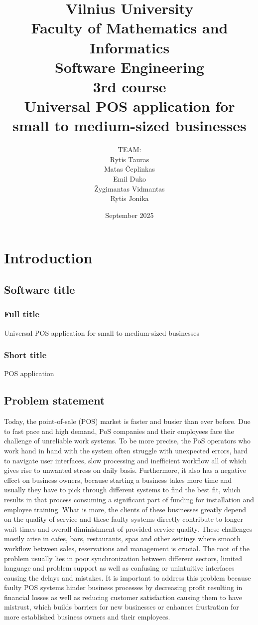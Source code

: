\documentclass{article}
\title{Vilnius University\\Faculty of Mathematics and Informatics\\Software Engineering\\3rd course\\[1cm] \Huge Universal POS application for small to medium-sized businesses\\[2cm]}
\author{TEAM:\\[0.25cm]Rytis Tauras\\Matas Čeplinkas\\Emil Duko\\Žygimantas Vidmantas\\Rytis Jonika\\[3cm]}
\date{September 2025}
\begin{document}
\maketitle

\newpage
\setcounter{tocdepth}{2}
\tableofcontents
\newpage

\section{Introduction}
\subsection{Software title}
\subsubsection{Full title} Universal POS application for small to medium-sized businesses
\subsubsection{Short title} POS application
\subsection{Problem statement} Today, the point-of-sale (POS) market is faster and busier than ever before. Due to fast pace and high demand, PoS companies and their employees face the challenge of unreliable work systems. To be more precise, the PoS operators who work hand in hand with the system often struggle with unexpected errors, hard to navigate user interfaces, slow processing and inefficient workflow all of which gives rise to unwanted stress on daily basis. Furthermore, it also has a negative effect on business owners, because starting a business takes more time and usually they have to pick through different systems to find the best fit, which results in that process consuming a significant part of funding for installation and employee training. What is more, the clients of these businesses greatly depend on the quality of service and these faulty systems directly contribute to longer wait times and overall diminishment of provided service quality. These challenges mostly arise in cafes, bars, restaurants, spas and other settings where smooth workflow between sales, reservations and management is crucial. The root of the problem usually lies in poor synchronization between different sectors, limited language and problem support as well as confusing or unintuitive interfaces causing the delays and mistakes. It is important to address this problem because faulty POS systems hinder business processes by decreasing profit resulting in financial losses as well as reducing customer satisfaction causing them to have mistrust, which builds barriers for new businesses or enhances frustration for more established business owners and their employees.
\newpage
\end{document}
